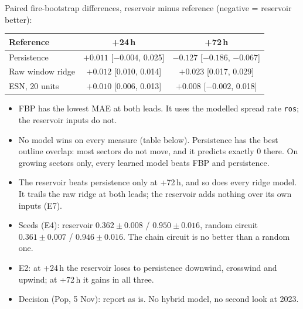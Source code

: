 \documentclass[11pt,a4paper]{article}
\newcommand{\code}[1]{\texttt{\small #1}}
\begin{document}
Paired fire-bootstrap differences, reservoir minus reference (negative = reservoir better):
\begin{center}\small
\begin{tabular}{@{}l c c@{}}
\toprule
\textbf{Reference} & \textbf{+24\,h} & \textbf{+72\,h}\\
\midrule
Persistence & $+0.011$ [$-0.004$, 0.025] & $\mathbf{-0.127}$ [$-0.186$, $-0.067$]\\
Raw window ridge & $+0.012$ [0.010, 0.014] & $+0.023$ [0.017, 0.029]\\
ESN, 20 units & $+0.010$ [0.006, 0.013] & $+0.008$ [$-0.002$, 0.018]\\
\bottomrule
\end{tabular}
\end{center}

\begin{itemize}
\item FBP has the lowest MAE at both leads. It uses the modelled spread rate \code{ros}; the reservoir inputs do not.
\item No model wins on every measure (table below). Persistence has the best outline overlap: most sectors do not
  move, and it predicts exactly 0 there. On growing sectors only, every learned model beats FBP and persistence.
\item The reservoir beats persistence only at +72\,h, and so does every ridge model. It trails the raw ridge at both
  leads; the reservoir adds nothing over its own inputs (E7).
\item Seeds (E4): reservoir $0.362\pm0.008$ / $0.950\pm0.016$, random circuit $0.361\pm0.007$ / $0.946\pm0.016$.
  The chain circuit is no better than a random one.
\item E2: at +24\,h the reservoir loses to persistence downwind, crosswind and upwind; at +72\,h it gains in all three.
\item Decision (Pop, 5 Nov): report as is. No hybrid model, no second look at 2023.
\end{itemize}
\end{document}
